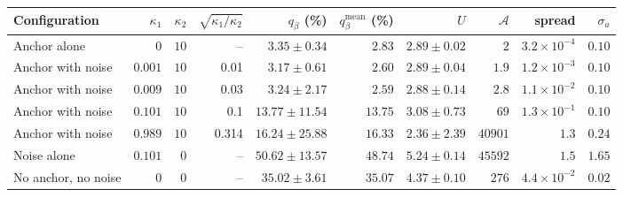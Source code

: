 \setlength{\tabcolsep}{4pt}\begin{tabular}{lrrrrrrrrr}
\toprule
Configuration & $\kappa_1$ & $\kappa_2$ & $\sqrt{\kappa_1/\kappa_2}$ & $q_\beta$ (\%) & $q_\beta^{\mathrm{mean}}$ (\%) & $U$ & $\mathcal A$ & spread & $\sigma_a$ \\
\midrule
Anchor alone & $0$ & $10$ & -- & $3.35\pm0.34$ & $2.83$ & $2.89\pm0.02$ & $2$ & $3.2\times10^{-4}$ & $0.10$ \\
Anchor with noise & $0.001$ & $10$ & 0.01 & $3.17\pm0.61$ & $2.60$ & $2.89\pm0.04$ & $1.9$ & $1.2\times10^{-3}$ & $0.10$ \\
Anchor with noise & $0.009$ & $10$ & 0.03 & $3.24\pm2.17$ & $2.59$ & $2.88\pm0.14$ & $2.8$ & $1.1\times10^{-2}$ & $0.10$ \\
Anchor with noise & $0.101$ & $10$ & 0.1 & $13.77\pm11.54$ & $13.75$ & $3.08\pm0.73$ & $69$ & $1.3\times10^{-1}$ & $0.10$ \\
Anchor with noise & $0.989$ & $10$ & 0.314 & $16.24\pm25.88$ & $16.33$ & $2.36\pm2.39$ & $40901$ & $1.3$ & $0.24$ \\
Noise alone & $0.101$ & $0$ & -- & $50.62\pm13.57$ & $48.74$ & $5.24\pm0.14$ & $45592$ & $1.5$ & $1.65$ \\
No anchor, no noise & $0$ & $0$ & -- & $35.02\pm3.61$ & $35.07$ & $4.37\pm0.10$ & $276$ & $4.4\times10^{-2}$ & $0.02$ \\
\bottomrule
\end{tabular}
